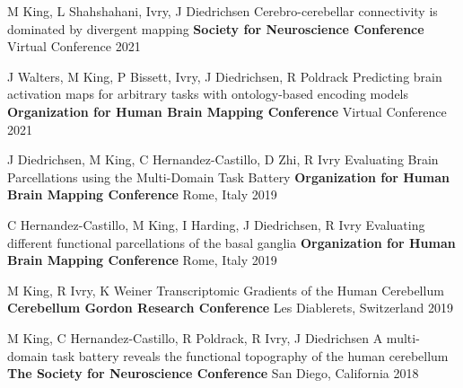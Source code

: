 

\begin{cventries}

  \cventry
    {M King, L Shahshahani, Ivry, J Diedrichsen} %
    {Cerebro-cerebellar connectivity is dominated by divergent mapping} %
    {\textbf{Society for Neuroscience Conference}} %
    {Virtual Conference} %
    {2021} %

  \cventry
    {J Walters, M King, P Bissett,  Ivry, J Diedrichsen, R Poldrack} %
    {Predicting brain activation maps for arbitrary tasks with ontology-based encoding models} %
    {\textbf{Organization for Human Brain Mapping Conference}} %
    {Virtual Conference} %
    {2021} %

  \cventry
    {J Diedrichsen, M King, C Hernandez-Castillo, D Zhi, R Ivry} %
    {Evaluating Brain Parcellations using the Multi-Domain Task Battery} %
    {\textbf{Organization for Human Brain Mapping Conference}} %
    {Rome, Italy} %
    {2019} %
    
  \cventry
    {C Hernandez-Castillo, M King, I Harding, J Diedrichsen, R Ivry} %
    {Evaluating different functional parcellations of the basal ganglia} %
    {\textbf{Organization for Human Brain Mapping Conference}} %
    {Rome, Italy} %
    {2019} %
    
  \cventry
    {M King, R Ivry, K Weiner} %
    {Transcriptomic Gradients of the Human Cerebellum} %
    {\textbf{Cerebellum Gordon Research Conference}} %
    {Les Diablerets, Switzerland} %
    {2019} %
    
  \cventry
    {M King, C Hernandez-Castillo, R Poldrack, R Ivry, J Diedrichsen} %
    {A multi-domain task battery reveals the functional topography of the human cerebellum} %
    {\textbf{The Society for Neuroscience Conference}} %
    {San Diego, California} %
    {2018} %


\end{cventries}

